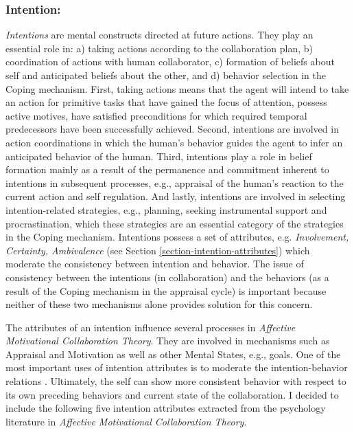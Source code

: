 \documentclass[letterpaper]{article}
\begin{document}
\subsubsection{Intention:}

\textit{Intentions} are mental constructs directed at future actions. They play
an essential role in: a) taking actions according to the collaboration plan, b)
coordination of actions with human collaborator, c) formation of beliefs about
self and anticipated beliefs about the other, and d) behavior selection in the
Coping mechanism. First, taking actions means that the agent will intend to take
an action for primitive tasks that have gained the focus of attention, possess
active motives, have satisfied preconditions for which required temporal
predecessors have been successfully achieved. Second, intentions are involved
in action coordinations in which the human's behavior guides the agent to infer
an anticipated behavior of the human. Third, intentions play a role in belief
formation mainly as a result of the permanence and commitment inherent to
intentions in subsequent processes, e.g., appraisal of the human's reaction to
the current action and self regulation. And lastly, intentions are involved in
selecting intention-related strategies, e.g., planning, seeking instrumental
support and procrastination, which these strategies are an essential category of
the strategies in the Coping mechanism. Intentions possess a set of attributes,
e.g. \textit{Involvement, Certainty, Ambivalence} (see Section
\ref{section-intention-attributes}) which moderate the consistency between
intention and behavior. The issue of consistency between the intentions (in
collaboration) and the behaviors (as a result of the Coping mechanism in the
appraisal cycle) is important because neither of these two mechanisms alone
provides solution for this concern.

The attributes of an intention influence several processes in \textit{Affective
Motivational Collaboration Theory}. They are involved in mechanisms such as
Appraisal and Motivation as well as other Mental States, e.g., goals. One of the
most important uses of intention attributes is to moderate the
intention-behavior relations \cite{cooke:intention-behavior-consistency}.
Ultimately, the self can show more consistent behavior with respect to its own
preceding behaviors and current state of the collaboration. I decided to include
the following five intention attributes extracted from the psychology literature
in \textit{Affective Motivational Collaboration Theory}.
\end{document}
